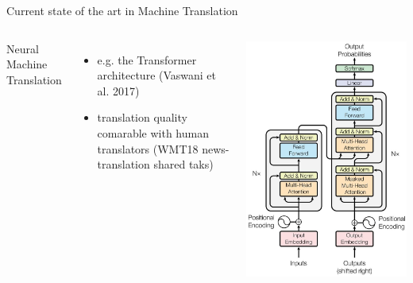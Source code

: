 \documentclass{beamer}
\begin{document}
\begin{frame}{Current state of the art in Machine Translation}
    \begin{columns}
    	    Neural Machine Translation
            \bigskip

            \begin{itemize}
                \item e.g. the Transformer architecture (Vaswani et al. 2017)
                \item translation quality comarable with human translators (WMT18 news-translation shared taks)
            \end{itemize}
        \begin{center}
            \includegraphics[scale=0.17]{transformer.png}
        \end{center}
    \end{columns}
\end{frame}
\end{document}
